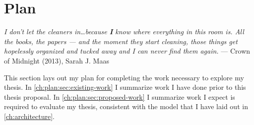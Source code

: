 \chapter{Plan}
\label{ch:plan}

\begin{epigraph}
    \textit{I don't let the cleaners in\ldots because \textbf{I} know where
        everything in this room is.  All the books, the papers --- and the moment
        they start cleaning, those things get hopelessly organized and tucked away
        and I can never find them again.} --- Crown of Midnight (2013), Sarah J. Maas
\end{epigraph}

This section lays out my plan for completing the work necessary to explore my
thesis.  In \autoref{ch:plan:sec:existing-work} I summarize work I
have done prior to this thesis proposal.  In \autoref{ch:plan:sec:proposed-work}
I summarize work I expect is required to evaluate my thesis,
consistent with the model that I have laid out in \autoref{ch:architecture}.

